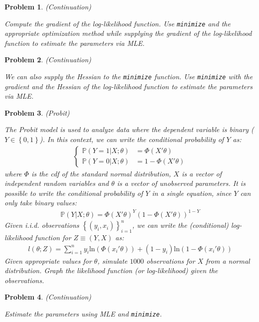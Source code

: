 \documentclass[12pt, a4paper]{article}
\newcommand{\Set}[1]{\left\{#1\right\}}
\renewcommand{\ln}[1]{\text{ln}\left(#1\right)}
\newtheorem{problem}{Problem}
\begin{document}
\begin{problem}
(Continuation)

Compute the gradient of the log-likelihood function.
Use \texttt{minimize} and the appropriate optimization method while supplying the gradient of the log-likelihood function to estimate the parameters via MLE.
\end{problem}

\begin{problem}
(Continuation)

We can also supply the Hessian to the \texttt{minimize} function.
Use \texttt{minimize} with the gradient and the Hessian of the log-likelihood function to estimate the parameters via MLE.
\end{problem}

\begin{problem}
(Probit)

The Probit model is used to analyze data where the dependent variable is binary (\(Y\in\Set{0, 1}\)).
In this context, we can write the conditional probability of \(Y\) as:
\begin{align*}
  \begin{cases}
    \mathbb{P}(Y=1\vert X; \theta) &= \Phi(X'\theta)\\
    \mathbb{P}(Y=0\vert X; \theta) &= 1 - \Phi(X'\theta)
  \end{cases}
\end{align*}
where \(\Phi\) is the cdf of the standard normal distribution, \(X\) is a vector of independent random variables and \(\theta\) is a vector of unobserved parameters.
It is possible to write the conditional probability of \(Y\) in a single equation, since \(Y\) can only take binary values:
\begin{align*}
\mathbb{P}(Y\vert X;\theta)={\Phi(X'\theta)}^Y(1-\Phi(X'\theta))^{1-Y}
\end{align*}
Given i.i.d. observations \(\Set{(y_i, x_i)}_{i=1}^n\), we can write the (conditional) log-likelihood function for \(Z\equiv(Y,X)\) as:
\begin{align*}
l(\theta; Z)=\sum_{i=1}^n y_i\ln{\Phi(x_i'\theta)} + (1-y_i)\ln{1-\Phi(x_i'\theta)}
\end{align*}
Given appropriate values for \(\theta\), simulate \(1000\) observations for \(X\) from a normal distribution.
Graph the likelihood function (or log-likelihood) given the observations.
\end{problem}

\begin{problem}
(Continuation)

Estimate the parameters using MLE and \texttt{minimize}.
\end{problem}
\end{document}
